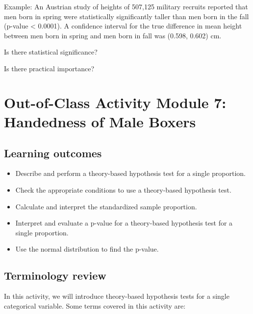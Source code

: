 \documentclass[
]{report}
\begin{document}
Example: An Austrian study of heights of 507,125 military recruits reported that men born in spring were statistically significantly taller than men born in the fall (p-value \textless{} 0.0001). A confidence interval for the true difference in mean height between men born in spring and men born in fall was (0.598, 0.602) cm.

Is there statistical significance?

\vspace{0.3in}

Is there practical importance?

\vspace{0.3in}

\newpage

\hypertarget{out-of-class-activity-module-7-handedness-of-male-boxers}{%
\section{Out-of-Class Activity Module 7: Handedness of Male Boxers}\label{out-of-class-activity-module-7-handedness-of-male-boxers}}


\hypertarget{learning-outcomes-12}{%
\subsection{Learning outcomes}\label{learning-outcomes-12}}

\begin{itemize}
\item
  Describe and perform a theory-based hypothesis test for a single proportion.
\item
  Check the appropriate conditions to use a theory-based hypothesis test.
\item
  Calculate and interpret the standardized sample proportion.
\item
  Interpret and evaluate a p-value for a theory-based hypothesis test for a single proportion.
\item
  Use the normal distribution to find the p-value.
\end{itemize}

\hypertarget{terminology-review-10}{%
\subsection{Terminology review}\label{terminology-review-10}}

In this activity, we will introduce theory-based hypothesis tests for a single categorical variable. Some terms covered in this activity are:
\end{document}
